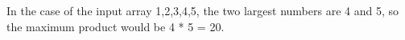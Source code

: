 \documentclass[preview]{standalone}
\begin{document}
In the case of the input array 1,2,3,4,5, the two largest numbers are 4 and 5, so the maximum product would be 4 * 5 = 20.\\
\end{document}
